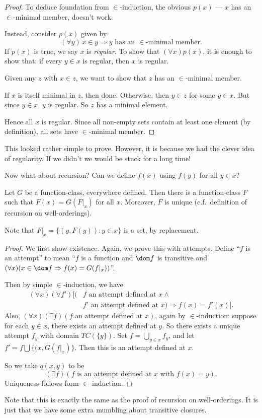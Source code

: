 \documentclass[a4paper]{article}
\begin{document}
\begin{proof}
  To deduce foundation from $\in$-induction, the obvious $p(x)$ --- $x$ has an $\in$-minimal member, doesn't work.

  Instead, consider $p(x)$ given by
  \[
    (\forall y)\,x\in y \Rightarrow y\text{ has an }\in\text{-minimal member}.
  \]
  If $p(x)$ is true, we say $x$ is \emph{regular}. To show that $(\forall x)p(x)$, it is enough to show that: if every $y\in x$ is regular, then $x$ is regular.

  Given any $z$ with $x\in z$, we want to show that $z$ has an $\in$-minimal member.

  If $x$ is itself minimal in $z$, then done. Otherwise, then $y\in z$ for some $y\in x$. But since $y\in x$, $y$ is regular. So $z$ has a minimal element.

  Hence all $x$ is regular. Since all non-empty sets contain at least one element (by definition), all sets have $\in$-minimal member.
\end{proof}
This looked rather simple to prove. However, it is because we had the clever idea of regularity. If we didn't we would be stuck for a long time!

Now what about recursion? Can we define $f(x)$ using $f(y)$ for all $y\in x$?

\begin{thm}
  Let $G$ be a function-class, everywhere defined. Then there is a function-class $F$ such that $F(x) = G(F|_x)$ for all $x$. Moreover, $F$ is unique (c.f.\ definition of recursion on well-orderings).
\end{thm}
Note that $F|_x = \{(y, F(y)): y\in x\}$ is a set, by replacement.

\begin{proof}
  We first show existence. Again, we prove this with attempts. Define ``$f$ is an attempt'' to mean ``$f$ is a function and $\dom f$ is transitive and $(\forall x)(x\in \dom f \Rightarrow f(x) = G(f|_x))$''.

  Then by simple $\in$-induction, we have
  \begin{align*}
    (\forall x)(\forall f')[(&f\text{ an attempt defined at }x\wedge\\
    & f'\text{ an attempt defined at $x$}) \Rightarrow f(x) = f'(x)].
  \end{align*}
  Also, $(\forall x)(\exists f)(f\text{ an attempt defined at }x)$, again by $\in$-induction: suppose for each $y\in x$, there exists an attempt defined at $y$. So there exists a unique attempt $f_y$ with domain $TC(\{y\})$. Set $f = \bigcup_{y\in x}f_y$, and let $f' = f\bigcup \{(x, G(f|_x)\}$. Then this is an attempt defined at $x$.

  So we take $q(x, y)$ to be
  \[
    (\exists f)(f\text{ is an attempt defined at }x\text{ with }f(x) = y).
  \]
  Uniqueness follows form $\in$-induction.
\end{proof}
Note that this is exactly the same as the proof of recursion on well-orderings. It is just that we have some extra mumbling about transitive closures.
\end{document}
